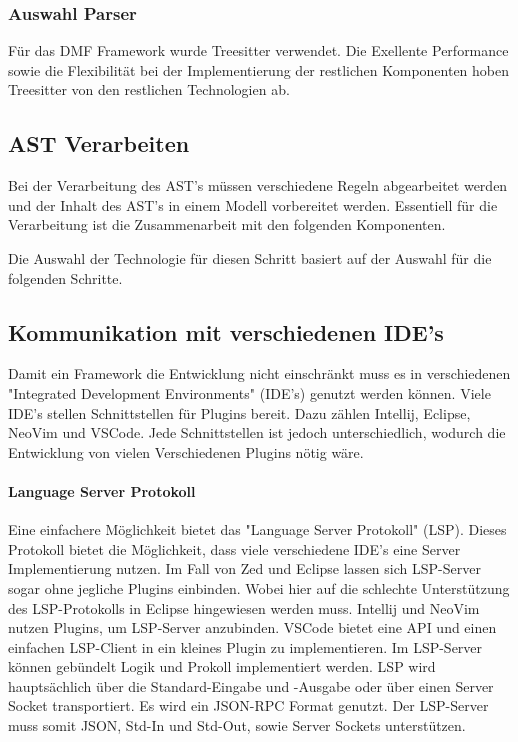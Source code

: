 \documentclass[./einleitung.tex]{subfiles}
\begin{document}
\subsubsection{Auswahl Parser}
Für das DMF Framework wurde Treesitter verwendet. Die Exellente Performance sowie die Flexibilität bei der Implementierung der restlichen Komponenten hoben Treesitter von den restlichen Technologien ab.


\subsection{AST Verarbeiten}
Bei der Verarbeitung des AST's müssen verschiedene Regeln abgearbeitet werden und der Inhalt des AST's in einem Modell vorbereitet werden.
Essentiell für die Verarbeitung ist die Zusammenarbeit mit den folgenden Komponenten.

Die Auswahl der Technologie für diesen Schritt basiert auf der Auswahl für die folgenden Schritte.

\subsection{Kommunikation mit verschiedenen IDE's}
Damit ein Framework die Entwicklung nicht einschränkt muss es in verschiedenen "Integrated Development Environments" (IDE's) genutzt werden können.
Viele IDE's stellen Schnittstellen für Plugins bereit. Dazu zählen Intellij, Eclipse, NeoVim und VSCode.
Jede Schnittstellen ist jedoch unterschiedlich, wodurch die Entwicklung von vielen Verschiedenen Plugins nötig wäre.
\paragraph{Language Server Protokoll}
Eine einfachere Möglichkeit bietet das "Language Server Protokoll" (LSP).
Dieses Protokoll bietet die Möglichkeit, dass viele verschiedene IDE's eine Server Implementierung nutzen. Im Fall von Zed und Eclipse lassen sich LSP-Server sogar ohne jegliche Plugins einbinden. Wobei hier auf die schlechte Unterstützung des LSP-Protokolls in Eclipse hingewiesen werden muss. 
Intellij und NeoVim nutzen Plugins, um LSP-Server anzubinden.
VSCode bietet eine API und einen einfachen LSP-Client in ein kleines Plugin zu implementieren.
Im LSP-Server können gebündelt Logik und Prokoll implementiert werden.
\newline\newline
LSP wird hauptsächlich über die Standard-Eingabe und -Ausgabe oder über einen Server Socket transportiert.
Es wird ein JSON-RPC Format genutzt.
Der LSP-Server muss somit JSON, Std-In und Std-Out, sowie Server Sockets unterstützen.
\end{document}
